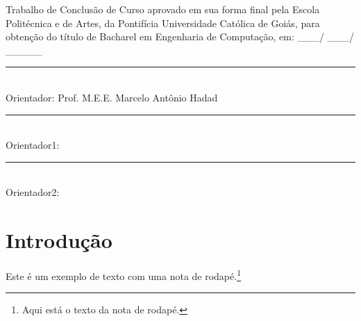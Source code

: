 \documentclass[12pt,a4paper,oneside,brazil]{abntex2}
\begin{document}
\clearpage
    \centering
    \imprimirautor

    \vfill

    \ABNTEXchapterfont\bfseries\imprimirtitulo

    \vfill

    \justifying

    \textnormal{Trabalho de Conclusão de Curso aprovado em sua forma final pela Escola Politécnica e de
    Artes, da Pontifícia Universidade Católica de Goiás, para obtenção do título de Bacharel em
    Engenharia de Computação, em: \_\_\_/ \_\_\_/ \_\_\_\_\_}

    \centering

    \vspace*{3cm}

    \begin{flushright}
    \rule{10cm}{0.4pt}\\
    \textnormal{Orientador: Prof. M.E.E. Marcelo Antônio Hadad}

    \vspace*{10mm}

    \rule{10cm}{0.4pt}\\
    \textnormal{Orientador1:}

    \vspace*{10mm}

    \rule{10cm}{0.4pt}\\
    \textnormal{Orientador2:}
    \end{flushright}

    \vspace*{6cm}

    \bfseries\imprimirlocal

    \bfseries\imprimirdata
\clearpage %


\tableofcontents
\clearpage
\listoffigures   %
\clearpage
\listoftables    %
\clearpage

\setcounter{page}{1}
\textual

\justifying

\chapter{Introdução}
Este é um exemplo de texto com uma nota de rodapé.\footnote{Aqui está o texto da nota de rodapé.} \lipsum[1]
\end{document}
